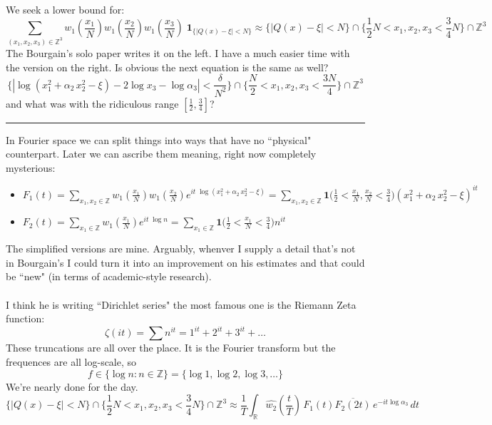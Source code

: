 \documentclass[12pt]{article}
\begin{document}
\newpage 

\noindent We seek a lower bound for:
$$ \sum_{(x_1, x_2, x_3) \in \mathbb{Z}^3} 
w_1(\frac{x_1}{N})
w_1(\frac{x_2}{N})
w_1(\frac{x_3}{N}) \; \mathbf{1}_{\big\{|Q(x)-\xi| < N\big\}}
\approx \big\{|Q(x)-\xi| < N\big\} \cap \big\{ \frac{1}{2}N < x_1, x_2, x_3 < \frac{3}{4}N \big\}\cap \mathbb{Z}^3$$
The Bourgain's solo paper writes it on the left.  I have a much easier time with the version on the right.  Is obvious the next equation is the same as well?
$$ 
\big\{|\log(x_1^2 +\alpha_2 \, x_2^2 -\xi) - 2 \log x_3 - \log \alpha_3 | < \frac{\delta}{N^2} \big\} \cap \big\{ \frac{N}{2} < x_1, x_2, x_3 < \frac{3N}{4} \big\}\cap \mathbb{Z}^3 $$
and what was with the ridiculous range $[ \frac{1}{2}, \frac{3}{4}]$? 
\vspace{6pt}
\hrule
\vspace{6pt}
In Fourier space we can split things into ways that have no ``physical" counterpart.  Later we can ascribe them meaning, right now completely mysterious:
\begin{itemize}
\item $\displaystyle F_1(t) = \sum_{x_1, x_2 \in \mathbb{Z}} w_1(\frac{x_1}{N}) w_1(\frac{x_2}{N})
e^{it \; \log (x_1^2 +\alpha_2 \, x_2^2 -\xi)} = \sum_{x_1, x_2 \in \mathbb{Z}} \mathbf{1}\big(\tfrac{1}{2} < \tfrac{x_1}{N} , \tfrac{x_2}{N} < \tfrac{3}{4} \big)
(x_1^2 +\alpha_2 \, x_2^2 -\xi)^{it} $ \\
\item $F_2(t) = 
\sum_{x_1\in \mathbb{Z}} w_1(\frac{x_1}{N}) 
e^{it \; \log n} = \sum_{x_1\in \mathbb{Z}} \mathbf{1}\big(\tfrac{1}{2} < \tfrac{x_1}{N}  < \tfrac{3}{4} \big)
n^{it}
$
\end{itemize}
The simplified versions are mine.  Arguably, whenver I supply a detail that's not in Bourgain's I could turn it into an improvement on his estimates and that could be ``new" (in terms of academic-style research). \\ \\
I think he is writing ``Dirichlet series" the most famous one is the Riemann Zeta function:
$$ \zeta(it) = \sum n^{it} = 1^{it} + 2^{it} + 3^{it} + \dots $$
These truncations are all over the place.  It is the Fourier transform but the frequences are all log-scale, so 
$$ f \in \big\{ \log n : n \in \mathbb{Z} \big\} = \big\{ \log 1, \log 2, \log 3, \dots  \big\} $$
We're nearly done for the day.  
$$ \big\{|Q(x)-\xi| < N\big\} \cap \big\{ \frac{1}{2}N < x_1, x_2, x_3 < \frac{3}{4}N \big\}\cap \mathbb{Z}^3 \approx \frac{1}{T} \int_\mathbb{R} \widehat{w_2}(\frac{t}{T}) \, F_1(t) \overline{F_2(2t)}\,
e^{-it \log \alpha_3} \, dt $$
\end{document}
